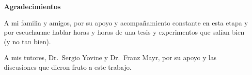 {\huge\bfseries \space Agradecimientos}

\bigskip
\bigskip

A mi familia y amigos, por su apoyo y acompañamiento constante en esta etapa y por escucharme hablar horas y horas de una tesis y experimentos que salían bien (y no tan bien). 

A mis tutores, Dr.~Sergio Yovine y Dr.~Franz Mayr, por su apoyo y las discusiones que dieron fruto a este trabajo.
    
\vspace*{\fill}

\newpage  
